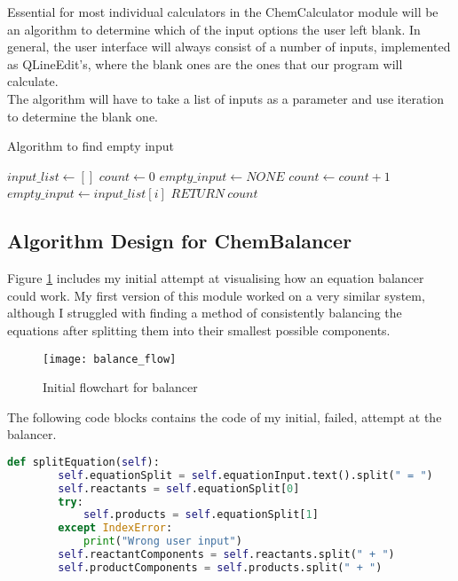 \documentclass[a4paper,12pt]{article}
\begin{document}
Essential for most individual calculators in the ChemCalculator module will be an algorithm to determine which of the input options the user left blank. In general, the user interface will always consist of a number of inputs, implemented as QLineEdit's, where the blank ones are the ones that our program will calculate.\\
The algorithm will have to take a list of inputs as a parameter and use iteration to determine the blank one.

\begin{algorithm}
\caption{Algorithm to find empty input}\label{alg:fing_empty_input}
\begin{algorithmic}
\State $ input\_list \gets []$
\State $ count \gets 0$
\State $ empty\_input \gets NONE$
	\State $ count \gets count\ $+$\ 1$
	\State $ empty\_input \gets input\_list[i]$
\EndIf
\EndFor
{}
	\State $ RETURN\ count$
\EndIf
\end{algorithmic}
\end{algorithm}

\newpage

\subsection{Algorithm Design for ChemBalancer}

Figure \ref{fig:balance_flow} includes my initial attempt at visualising how an equation balancer could work. My first version of this module worked on a very similar system, although I struggled with finding a method of consistently balancing the equations after splitting them into their smallest possible components. 

\begin{figure} [h]
	\centering
	\texttt{[image: balance\_flow]}
	\caption{Initial flowchart for balancer}
	\label{fig:balance_flow}
\end{figure}

The following code blocks contains the code of my initial, failed, attempt at the balancer.

\begin{lstlisting}[language=Python, caption=Method for splitting equation into components, label={lst:split_equation}]
def splitEquation(self):
        self.equationSplit = self.equationInput.text().split(" = ")
        self.reactants = self.equationSplit[0]
        try:
            self.products = self.equationSplit[1]
        except IndexError:
            print("Wrong user input")
        self.reactantComponents = self.reactants.split(" + ")
        self.productComponents = self.products.split(" + ")
\end{lstlisting}
\end{document}
